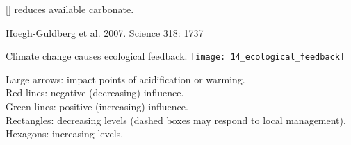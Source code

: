 \documentclass[t,handout]{beamer}  %
\begin{document}
%
{
\begin{frame}[b]{[] reduces available carbonate.}

\Tiny Hoegh-Guldberg et al. 2007. Science 318: 1737
\end{frame}
}
%
{
\begin{frame}[b]

\hfill \tiny {}
\end{frame}
}
%
\begin{frame}{Climate change causes ecological feedback.}
\texttt{[image: 14\_ecological\_feedback]}

\bigskip

{\small
Large arrows: impact points of acidification or warming. \\
Red lines: negative (decreasing) influence. \\
Green lines: positive (increasing) influence. \\
Rectangles: decreasing levels (dashed boxes may respond to local management). \\
Hexagons: increasing levels.}

\end{frame}
%
{
\begin{frame}[b]

	\hfill \tiny {}
\end{frame}
}
%
{
\begin{frame}[b]

	\hfill \tiny {}
\end{frame}
}
%
\end{document}
